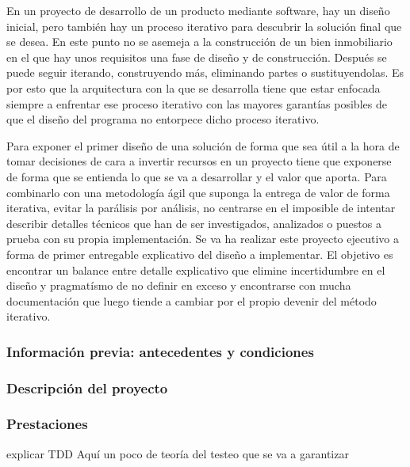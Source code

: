 En un proyecto de desarrollo de un producto mediante software, hay un diseño inicial, pero también hay un proceso iterativo para descubrir la solución final que se desea. En este punto no se asemeja a la construcción de un bien inmobiliario en el que hay unos requisitos una fase de diseño y de construcción. Después se puede seguir iterando, construyendo más, eliminando partes o sustituyendolas. Es por esto que la arquitectura con la que se desarrolla tiene que estar enfocada siempre a enfrentar ese proceso iterativo con las mayores garantías posibles de que el diseño del programa no entorpece dicho proceso iterativo.

Para exponer el primer diseño de una solución de forma que sea útil a la hora de tomar decisiones de cara a invertir recursos en un proyecto tiene que exponerse de forma que se entienda lo que se va a desarrollar y el valor que aporta. Para combinarlo con una metodología ágil que suponga la entrega de valor de forma iterativa, evitar la parálisis por análisis, no centrarse en el imposible de intentar describir detalles técnicos que han de ser investigados, analizados o puestos a prueba con su propia implementación. Se va ha realizar este proyecto ejecutivo a forma de primer entregable explicativo del diseño a implementar. El objetivo es encontrar un balance entre detalle explicativo que elimine incertidumbre en el diseño y pragmatísmo de no definir en exceso y encontrarse con mucha documentación que luego tiende a cambiar por el propio devenir del método iterativo.

\subsubsection{Información previa: antecedentes y condiciones}
    
\subsubsection{Descripción del proyecto}
    
\subsubsection{Prestaciones}
explicar TDD Aquí un poco de teoría del testeo que se va a garantizar



